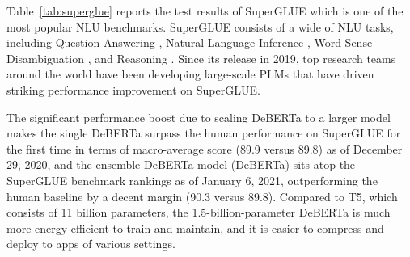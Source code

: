 Table~\ref{tab:superglue} reports the test results of SuperGLUE \citep{wang2019superglue} which is one of the most popular NLU benchmarks. 
SuperGLUE consists of a wide of NLU tasks, including  
Question Answering \citep{clark2019boolq, khashabi2018multirc, zhang2018record}, 
Natural Language Inference \citep{rte1,rte2,rte3, rte5}, Word Sense Disambiguation \citep{pilehvar2019wic}, and Reasoning \citep{levesque2011winograd,roemmele2011choice}. 
Since its release in 2019, top research teams around the world have been developing large-scale PLMs that have driven striking performance improvement on SuperGLUE. 

The significant performance boost due to scaling DeBERTa to a larger model makes the single DeBERTa surpass the human performance on SuperGLUE for the first time in terms of macro-average score (89.9 versus 89.8) as of December 29, 2020, and the ensemble DeBERTa model (DeBERTa) sits atop the SuperGLUE benchmark rankings as of January 6, 2021, outperforming the human baseline by a decent margin (90.3 versus 89.8). 
Compared to T5, which consists of 11 billion parameters, the 1.5-billion-parameter DeBERTa is much more energy efficient to train and maintain, and it is easier to compress and deploy to apps of various settings.




